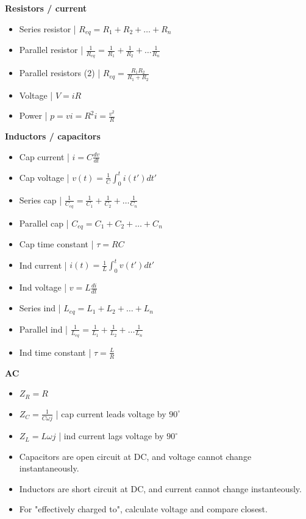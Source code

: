 \documentclass{article}
\begin{document}
\textbf{Resistors / current}
\begin{itemize}
    \item Series resistor | $R_{eq} = R_1 + R_2 + \dots + R_n$
    \item Parallel resistor | $\frac{1}{R_{eq}} = \frac{1}{R_1} + \frac{1}{R_2} + \dots \frac{1}{R_n}$
    \item Parallel resistors (2) | $R_{eq} = \frac{R_1R_2}{R_1 + R_2}$
    \item Voltage | $V = iR$
    \item Power | $p = vi = R^2i = \frac{v^2}{R}$
\end{itemize}
\textbf{Inductors / capacitors}
\begin{itemize}
    \item Cap current | $i = C \frac{dv}{dt}$
    \item Cap voltage | $v(t) = \frac{1}{C}\int_0^t i(t')dt'$
    \item Series cap | $\frac{1}{C_{eq}} = \frac{1}{C_1} + \frac{1}{C_2} + \dots \frac{1}{C_n}$
    \item Parallel cap | $C_{eq} = C_1 + C_2 + \dots + C_n$
    \item Cap time constant | $\tau = RC$
    \item Ind current | $i(t) = \frac{1}{L}\int_0^t v(t')dt'$
    \item Ind voltage | $v = L \frac{di}{dt}$
    \item Series ind | $L_{eq} = L_1 + L_2 + \dots + L_n$
    \item Parallel ind | $\frac{1}{L_{eq}} = \frac{1}{L_1} + \frac{1}{L_2} + \dots \frac{1}{L_n}$
    \item Ind time constant | $\tau = \frac{L}{R}$
\end{itemize}
\textbf{AC}
\begin{itemize}
    \item $Z_R = R$
    \item $Z_C = \frac{1}{C \omega j}$ | cap current leads voltage by $90^{\circ}$
    \item $Z_L = L \omega j$ | ind current lags voltage by $90^{\circ}$
    \item Capacitors are open circuit at DC, and voltage cannot change instantaneously.
    \item Inductors are short circuit at DC, and current cannot change instanteously.
    \item For "effectively charged to", calculate voltage and compare closest.
\end{itemize}
\end{document}

